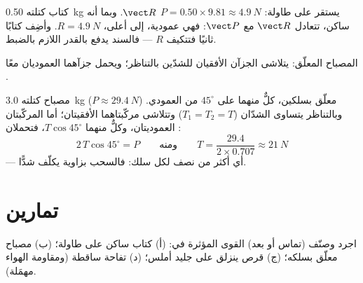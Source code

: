 \begin{example}\label{ex:g10:inertia:book}
كتاب كتلته \qty{0.50}{kg} يستقر على طاولة: 
$P = 0.50 \times 9.81 \approx \qty{4.9}{N}$ 
$\vect R$. وبما أنه ساكن، تتعادل $\vect R$ مع $\vect P$: فهي عمودية، إلى أعلى،
$R = \qty{4.9}{N}$. وأضِف كتابًا ثانيًا فتتكيف $R$ --- فالسند
يدفع بالقدر اللازم بالضبط.
\end{example}

\begin{omfigure}

{\small المصباح المعلّق: يتلاشى الجزآن الأفقيان للشدّين
بالتناظر؛ ويحمل جزآهما العموديان معًا .}
\end{omfigure}

\begin{example}\label{ex:g10:inertia:lamp}
مصباح كتلته \qty{3.0}{kg} ($P \approx \qty{29.4}{N}$) معلّق بسلكين،
كلٌّ منهما على $45^\circ$ من العمودي. وبالتناظر يتساوى الشدّان
($T_1 = T_2 = T$) وتتلاشى مركّبتاهما الأفقيتان؛ أما المركّبتان
العموديتان، وكلٌّ منهما $T \cos 45^\circ$، فتحملان :
\[
2\,T \cos 45^\circ = P
\qquad\text{ومنه}\qquad
T = \frac{29.4}{2 \times 0.707} \approx \qty{21}{N}
\]
--- أي أكثر من نصف  لكل سلك: فالسحب بزاوية يكلّف
شدًّا.
\end{example}

\section{تمارين}

\begin{exercise}[$\star$]\label{exo:g10:inertia:1}
اجرد وصنّف (تماس أو بعد) القوى المؤثرة في: (أ) كتاب
ساكن على طاولة؛ (ب) مصباح معلّق بسلكه؛ (ج) قرص
ينزلق على جليد أملس؛ (د) تفاحة ساقطة (ومقاومة الهواء
مهمَلة).
\end{exercise}

